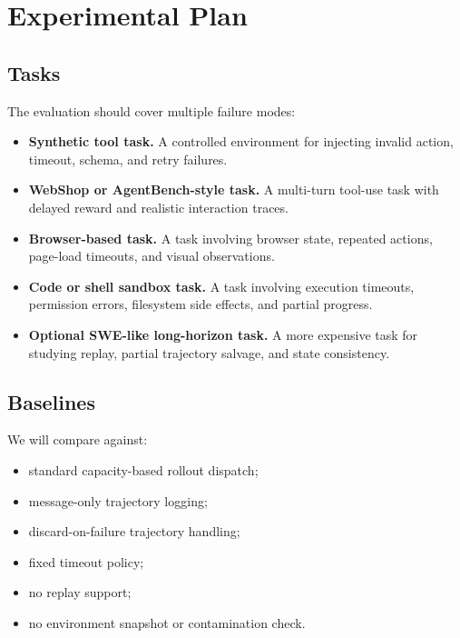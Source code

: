 \documentclass[11pt]{article}
\begin{document}
\section{Experimental Plan}

\subsection{Tasks}

The evaluation should cover multiple failure modes:

\begin{itemize}[leftmargin=*]
    \item \textbf{Synthetic tool task.}
    A controlled environment for injecting invalid action, timeout, schema, and retry failures.

    \item \textbf{WebShop or AgentBench-style task.}
    A multi-turn tool-use task with delayed reward and realistic interaction traces.

    \item \textbf{Browser-based task.}
    A task involving browser state, repeated actions, page-load timeouts, and visual observations.

    \item \textbf{Code or shell sandbox task.}
    A task involving execution timeouts, permission errors, filesystem side effects, and partial progress.

    \item \textbf{Optional SWE-like long-horizon task.}
    A more expensive task for studying replay, partial trajectory salvage, and state consistency.
\end{itemize}

\subsection{Baselines}

We will compare against:

\begin{itemize}[leftmargin=*]
    \item standard capacity-based rollout dispatch;
    \item message-only trajectory logging;
    \item discard-on-failure trajectory handling;
    \item fixed timeout policy;
    \item no replay support;
    \item no environment snapshot or contamination check.
\end{itemize}
\end{document}
